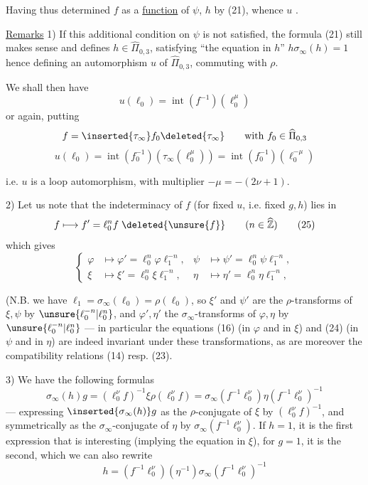 Having thus determined $f$ as a \uline{function} of $\psi$,  $h$ by (21), whence $u$ .

\uline{Remarks} 1) If this additional condition on $\psi$ is not satisfied, the  formula (21) still makes sense and defines $h\in\widehat{\Pi}_{0,3}$, satisfying ``the equation in $h$'' $h\sigma_\infty(h)=1$ hence defining an automorphism $u$ of $\widehat{\Pi}_{0,3}$, commuting with $\rho$.

We shall then have
\[
u(\ell_0)=\operatorname{int}(f^{-1})(\ell_0^\mu)
\]
or again, putting
\[
f=\inserted{\tau_\infty}f_0\deleted{\tau_\infty}\qquad\text{with }f_0\in\widehat{\Pi}_{0,3}
\]
\[
u(\ell_0)=\operatorname{int}(f_0^{-1})(\tau_\infty(\ell_0^\mu))=\operatorname{int}(f_0^{-1})(\ell_0^{-\mu})
\]



i.e. $u$ is a loop automorphism, with multiplier $-\mu=-(2\nu+1)$.

2) Let us note that the indeterminacy of $f$ (for fixed $u$, i.e. fixed $g,h$) lies in
\[
 f\longmapsto f'=\ell_0^n f\;\deleted{\unsure{f}}
 \qquad(n\in\widehat{\mathbb Z})
 \tag{25}
\]
which gives
\[
 \left\{\begin{aligned}
 \varphi&\longmapsto\varphi'=\ell_0^n\varphi\ell_1^{-n},&
 \psi&\longmapsto\psi'=\ell_0^n\psi\ell_1^{-n},\\
 \xi&\longmapsto\xi'=\ell_0^n\xi\ell_1^{-n},&
 \eta&\longmapsto\eta'=\ell_0^n\eta\ell_1^{-n},
 \end{aligned}\right.
 \tag{26}
\]

(N.B. we have $\ell_1=\sigma_\infty(\ell_0)=\rho(\ell_0)$, so $\xi'$ and $\psi'$ are the $\rho$-transforms of $\xi,\psi$ by $\unsure{\ell_0^{-n}|\ell_0^n}$, and $\varphi',\eta'$ the $\sigma_\infty$-transforms of $\varphi,\eta$ by $\unsure{\ell_0^{-n}|\ell_0^n}$ --- in particular the equations (16) (in $\varphi$ and in $\xi$) and (24) (in $\psi$ and in $\eta$) are indeed invariant under these transformations, as are moreover the compatibility relations (14) resp. (23).

3) We have the following formulas 
\[
 \sigma_\infty(h)g
 = (\ell_0^\nu f)^{-1}\xi\rho(\ell_0^\nu f)
 = \sigma_\infty(f^{-1}\ell_0^\nu)\eta(f^{-1}\ell_0^\nu)^{-1}
 \tag{27}
\]
 --- expressing $\inserted{\sigma_\infty(h)}g$ as the $\rho$-conjugate of $\xi$ by $(\ell_0^\nu f)^{-1}$, and symmetrically  as the $\sigma_\infty$-conjugate of $\eta$ by $\sigma_\infty(f^{-1}\ell_0^\nu)$. If $h=1$, it is the first expression that is interesting (implying the equation in $\xi$), for $g=1$, it is the second, which we can also rewrite 
\[
 h=(f^{-1}\ell_0^\nu)(\eta^{-1})\sigma_\infty(f^{-1}\ell_0^\nu)^{-1}
 \tag{28}
\]

